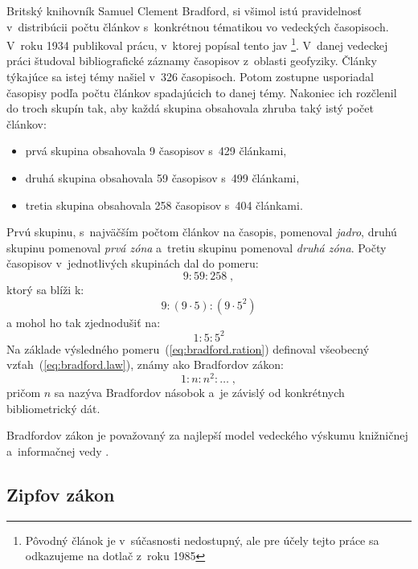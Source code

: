 Britský knihovník Samuel Clement Bradford, si všimol istú pravidelnosť
v~distribúcii počtu článkov s~konkrétnou tématikou vo vedeckých časopisoch.
V~roku 1934 publikoval prácu, v~ktorej popísal tento jav
\citep{Bradford1985}\footnote{Pôvodný článok je v~súčasnosti nedostupný, ale pre
  účely tejto práce sa odkazujeme na dotlač z~roku 1985}.  V~danej vedeckej
práci študoval bibliografické záznamy časopisov z~oblasti geofyziky.  Články
týkajúce sa istej témy našiel v~326 časopisoch.  Potom zostupne usporiadal
časopisy podľa počtu článkov spadajúcich to danej témy.  Nakoniec ich rozčlenil
do troch skupín tak, aby každá skupina obsahovala zhruba taký istý počet
článkov:

\begin{itemize}
\item prvá skupina obsahovala 9 časopisov s~429 článkami,
\item druhá skupina obsahovala 59 časopisov s~499 článkami,
\item tretia skupina obsahovala 258 časopisov s~404 článkami.
\end{itemize}
Prvú skupinu, s~najväčším počtom článkov na časopis, pomenoval \emph{jadro},
druhú skupinu pomenoval \emph{prvá zóna} a~tretiu skupinu pomenoval \emph{druhá
  zóna}.  Počty časopisov v~jednotlivých skupinách dal do pomeru:
\begin{equation*}
9 : 59 : 258 \;,
\end{equation*}
ktorý sa blíži k:
\begin{equation*}
9 : (9 \cdot 5) : (9 \cdot 5^2)
\end{equation*}
a mohol ho tak zjednodušiť na:
\begin{equation}
\label{eq:bradford.ration}
1 : 5 : 5^2
\end{equation}
Na základe výsledného pomeru~(\ref{eq:bradford.ration}) definoval všeobecný
vzťah~(\ref{eq:bradford.law}), známy ako Bradfordov zákon:
\begin{equation}
\label{eq:bradford.law}
1 : n : n^2 : \dotso \;,
\end{equation}
pričom $n$ sa nazýva Bradfordov násobok a~je závislý od konkrétnych
bibliometrický dát.

Bradfordov zákon je považovaný za najlepší model vedeckého výskumu knižničnej
a~informačnej vedy \citep[napr.][]{Nicolaisen2007}.


\subsection{Zipfov zákon}

